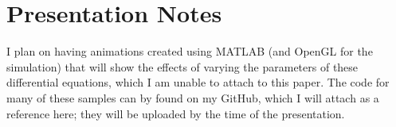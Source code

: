 \documentclass{article}
\begin{document}
\section{Presentation Notes}
I plan on having animations created using MATLAB (and OpenGL for the simulation) that will show the effects of varying the parameters of these differential equations, which I am unable to attach to this paper. The code for many of these samples can by found on my GitHub, which I will attach as a reference here; they will be uploaded by the time of the presentation.



\nocite{*}



\printbibliography

% 
\end{document}
